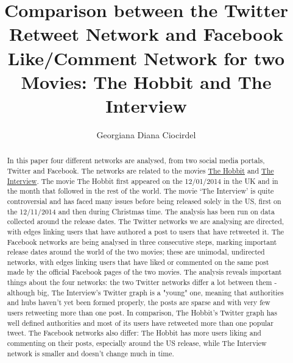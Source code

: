 \documentclass{llncs}
\begin{document}
\title{Comparison between the Twitter Retweet Network and Facebook Like/Comment
Network for two Movies: The Hobbit and The Interview}
\author{Georgiana Diana Ciocirdel}
\maketitle
%
\begin{abstract}
In this paper four different networks are analysed, from two social media
portals, Twitter and Facebook. The networks are related to the movies
\href{http://www.thehobbit.com/}{The Hobbit} and
\href{http://www.theinterview-movie.com/}{The Interview}. The movie The Hobbit
first appeared on the 12/01/2014 in the UK and in the month that followed in the
rest of the world. The movie ‘The Interview’ is quite controversial and has
faced many issues before being released solely in the US, first on the
12/11/2014 and then during Christmas time. The analysis has been run on data
collected around the release dates. The Twitter networks we are analysing are
directed, with edges linking users that have authored a post to users that have
retweeted it. The Facebook networks are being analysed in three consecutive
steps, marking important release dates around the world of the two movies; these
are unimodal, undirected networks, with edges linking users that have liked or
commented on the same post made by the official Facebook pages of the two
movies. The analysis reveals important things about the four networks: the
two Twitter networks differ a lot between them - although big, The Interview's
Twitter graph is a "young" one, meaning that authorities and hubs haven't yet
been formed properly, the posts are sparse and with very few users retweeting
more than one post. In comparison, The Hobbit's Twitter graph has well defined
authorities and most of its users have retweeted more than one popular tweet.
The Facebook networks also differ: The Hobbit has more users liking and
commenting on their posts, especially around the US release, while The Interview
network is smaller and doesn't change much in time.
\end{abstract}
%
\end{document}
